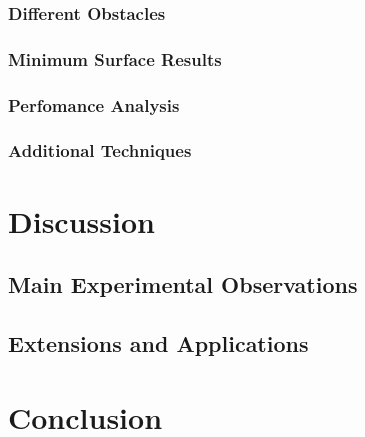 \documentclass[11pt]{article}
\begin{document}
\subsubsection{Different Obstacles}
\subsubsection{Minimum Surface Results}
\subsubsection{Perfomance Analysis}
\subsubsection{Additional Techniques}


\section{Discussion}
\subsection{Main Experimental Observations}
\subsection{Extensions and Applications}


\section{Conclusion}


\end{document}
